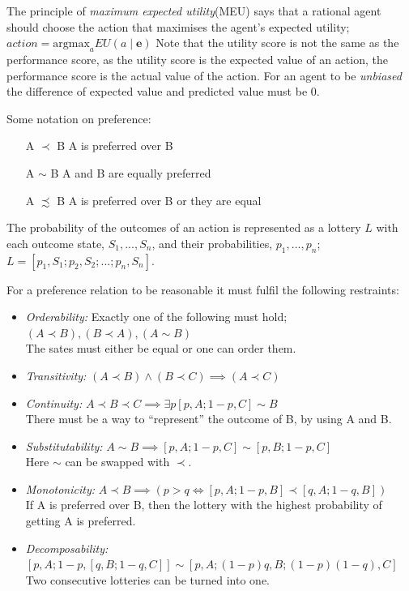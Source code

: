 \documentclass[11pt, letterpaper]{report}
\numberwithin{equation}{section}
\begin{document}
The principle of \emph{maximum expected utility}(MEU) says that a rational agent
should choose the action that maximises the agent's expected utility; $action =
\text{argmax}_a EU(a \mid \boldsymbol{e})$
Note that the utility score is not the same as the performance score, as the
utility score is the expected value of an action, the performance score is the
actual value of the action. For an agent to be \emph{unbiased} the difference of
expected value and predicted value must be 0.

Some notation on preference:
\begin{itemize}
\item[A $\prec$ B] A is preferred over B
\item[A $\sim$ B] A and B are equally preferred
\item[A $\precsim$ B] A is preferred over B or they are equal
\end{itemize}
The probability of the outcomes of an action is represented as a lottery $L$
with each outcome state, $S_1,...,S_n$, and their probabilities, $p_1,...,p_n$;
$L = [p_1,S_1;p_2,S_2;...;p_n,S_n]$.

For a preference relation to be reasonable it must fulfil the following
restraints:
\begin{itemize}
\item \emph{Orderability:} Exactly one of the following must hold;
  $(A \prec B), (B \prec A), (A \sim B)$ \\
  The sates must either be equal or one can order them.
\item \emph{Transitivity:} $(A \prec B) \wedge (B \prec C) \implies (A \prec
  C)$
\item \emph{Continuity:} $A \prec B \prec C \implies \exists p [p,A; 1-p,C] \sim
  B$ \\
  There must be a way to ``represent'' the outcome of B, by using A and B.
\item \emph{Substitutability:} $A \sim B \implies [p,A; 1-p,C] \sim [p,B;
  1-p,C]$ \\
  Here $\sim$ can be swapped with $\prec$.
\item \emph{Monotonicity:} $ A \prec B \implies (p > q \iff [p,A; 1-p,B] \prec
  [q,A;1-q,B]) $ \\ If A is preferred over B, then the lottery with the highest
  probability of getting A is preferred.
\item \emph{Decomposability:} $[p,A;1-p,[q,B;1-q,C]] \sim
  [p,A;(1-p)q,B;(1-p)(1-q),C]$ \\ Two consecutive lotteries can be turned into one.
\end{itemize}
\end{document}
